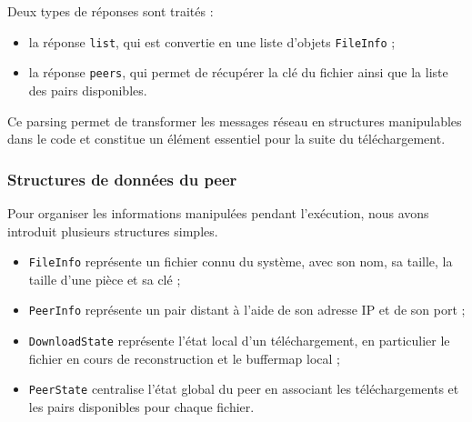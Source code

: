 Deux types de réponses sont traités :
\begin{itemize}
    \item la réponse \texttt{list}, qui est convertie en une liste d’objets \texttt{FileInfo} ;
    \item la réponse \texttt{peers}, qui permet de récupérer la clé du fichier ainsi que la liste des pairs disponibles.
\end{itemize}

Ce parsing permet de transformer les messages réseau en structures manipulables dans le code et constitue un élément essentiel pour la suite du téléchargement.
\subsubsection{Structures de données du peer}

Pour organiser les informations manipulées pendant l’exécution, nous avons introduit plusieurs structures simples.

\begin{itemize}
    \item \texttt{FileInfo} représente un fichier connu du système, avec son nom, sa taille, la taille d’une pièce et sa clé ;
    \item \texttt{PeerInfo} représente un pair distant à l’aide de son adresse IP et de son port ;
    \item \texttt{DownloadState} représente l’état local d’un téléchargement, en particulier le fichier en cours de reconstruction et le buffermap local ;
    \item \texttt{PeerState} centralise l’état global du peer en associant les téléchargements et les pairs disponibles pour chaque fichier.
\end{itemize}



